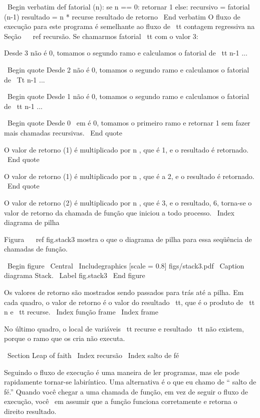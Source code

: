 \documentclass[10pt]{book}
\begin{document}
{{{{\ Begin {verbatim}
def fatorial (n):
    se n == 0:
        retornar 1
    else:
        recursivo = fatorial (n-1)
        resultado = n * recurse
        resultado de retorno
\ End {verbatim}
%
O fluxo de execução para este programa é semelhante ao fluxo de {\ tt
contagem regressiva} na Seção ~ \ ref {recursão}. Se chamarmos fatorial {\ tt}
com o valor 3:

Desde 3 não é 0, tomamos o segundo ramo e calculamos o fatorial
de {\ tt n-1} ...

\ Begin {quote}
Desde 2 não é 0, tomamos o segundo ramo e calculamos o fatorial de
{\ Tt n-1} ...


  \ Begin {quote}
  Desde 1 não é 0, tomamos o segundo ramo e calculamos o fatorial
  de {\ tt n-1} ...


    \ Begin {quote}
    Desde 0 {\ em} é 0, tomamos o primeiro ramo e retornar 1
    sem fazer mais chamadas recursivas.
    \ End {quote}


  O valor de retorno (1) é multiplicado por n $ $, que é 1, e o
  resultado é retornado.
  \ End {quote}


O valor de retorno (1) é multiplicado por n $ $, que é a 2, e o
resultado é retornado.
\ End {quote}


O valor de retorno (2) é multiplicado por n $ $, que é 3, e o resultado, 6,
torna-se o valor de retorno da chamada de função que iniciou a todo
processo.
\ Index {diagrama de pilha}

Figura ~ \ ref {} fig.stack3 mostra o que o diagrama de pilha para
essa seqüência de chamadas de função.

\ Begin {figure}
\ Central
{\ Includegraphics [scale = 0.8] {figs/stack3.pdf}}
\ Caption {diagrama Stack.}
\ Label {} fig.stack3
\ End {figure}

Os valores de retorno são mostrados sendo passados ​​para trás até a pilha. Em cada
quadro, o valor de retorno é o valor do resultado {\ tt}, que é o
produto de {\ tt n} e {\ tt recurse}.
\ Index {função frame}
\ Index {frame}

No último quadro, o local de
variáveis ​​{\ tt recurse} e {resultado \ tt} não existem, porque
o ramo que os cria não executa.


\ Section {Leap of faith}
\ Index {recursão}
\ Index {salto de fé}

Seguindo o fluxo de execução é uma maneira de ler programas, mas
ele pode rapidamente tornar-se labiríntico. Uma
alternativa é o que eu chamo de `` salto de fé.'' Quando você chegar a uma
chamada de função, em vez de seguir o fluxo de execução, você {\ em
assumir} que a função funciona corretamente e retorna o direito
resultado.

}}}}
\end{document}
